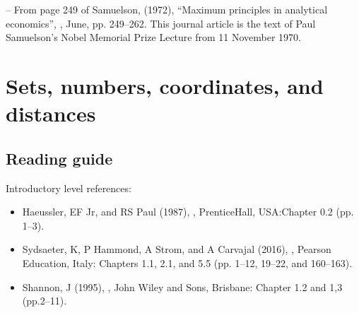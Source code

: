 \documentclass[letterpaper,10pt,english]{jupyterBook}
\begin{document}
\sphinxAtStartPar
– From page 249 of Samuelson, (1972), “Maximum principles in analytical economics”, , June, pp. 249–262. This journal article is the text of Paul Samuelson’s Nobel Memorial Prize Lecture from 11 November 1970.

\sphinxstepscope


\chapter{Sets, numbers, coordinates, and distances}
\label{\detokenize{02.sets_numbers_coordinates_distances:sets-numbers-coordinates-and-distances}}\label{\detokenize{02.sets_numbers_coordinates_distances::doc}}

\section{Reading guide}
\label{\detokenize{02.sets_numbers_coordinates_distances:reading-guide}}
\sphinxAtStartPar
Introductory level references:
\begin{itemize}
\item {} 
\sphinxAtStartPar
Haeussler, EF Jr, and RS Paul (1987), , Prentice\sphinxhyphen{}Hall, USA:Chapter 0.2 (pp. 1–3).

\item {} 
\sphinxAtStartPar
Sydsaeter, K, P Hammond, A Strom, and A Carvajal (2016), , Pearson Education, Italy: Chapters 1.1, 2.1, and 5.5 (pp. 1–12, 19–22, and 160–163).

\item {} 
\sphinxAtStartPar
Shannon, J (1995), , John Wiley and Sons, Brisbane: Chapter 1.2 and 1,3 (pp.2–11).

\end{itemize}
\end{document}
